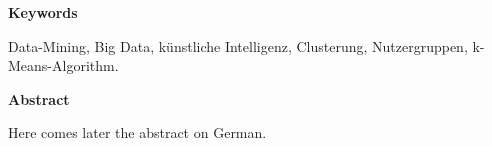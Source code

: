 {\Large \textbf{Keywords}}\vspace{0.1cm}

Data-Mining, Big Data, künstliche Intelligenz, Clusterung, Nutzergruppen, k-Means-Algorithm.\vspace{0.5cm}

{\Large \textbf{Abstract}}\vspace{0.1cm}

Here comes later the abstract on German.
